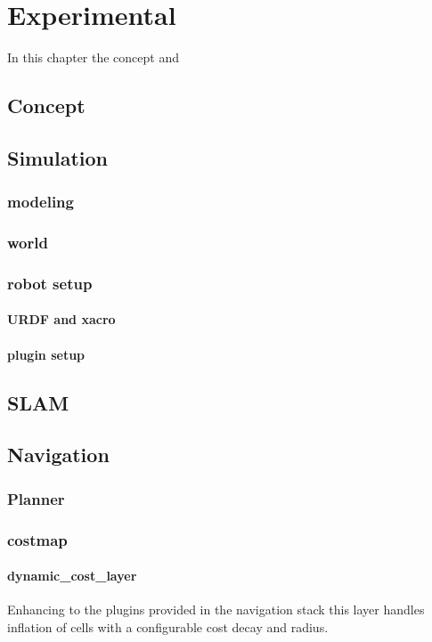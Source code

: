 \chapter{Experimental}
\label{experimental}

In this chapter the concept and  


\section{Concept}
\section{Simulation}
\subsection{modeling}
\subsection{world}
\subsection{robot setup}
\subsubsection{URDF and xacro}
\subsubsection{plugin setup}
\section{SLAM}

\section{Navigation}
\subsection{Planner}
\subsection{costmap}
\subsubsection{dynamic\_cost\_layer}
Enhancing to the plugins provided in the navigation stack this layer handles inflation of cells with a configurable cost decay and radius.\\

